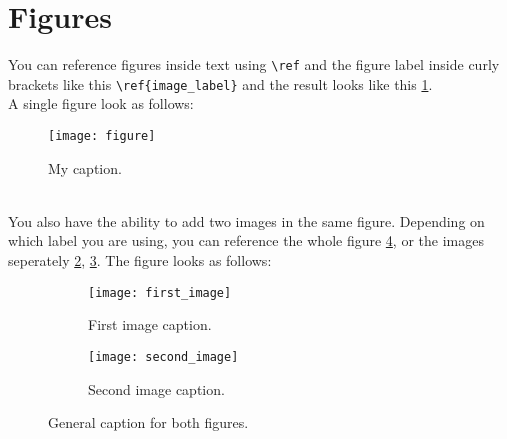 \section{Figures}
You can reference figures inside text using \verb|\ref| and the figure label inside curly brackets like this \verb|\ref{image_label}| and the result looks like this \ref{fig:image}. \\

A single figure look as follows:\\
\begin{figure}[ht]
\texttt{[image: figure]}
\caption{My caption.}
\label{fig:image}
\end{figure}
\\
You also have the ability to add two images in the same figure. Depending on which label you are using, you can reference the whole figure \ref{fig:double_image}, or the images seperately \ref{fig:first_image}, \ref{fig:second_image}. The figure looks as follows:
\begin{figure}[ht]
\centering
\begin{subfigure}{.5\textwidth}
\centering
\texttt{[image: first\_image]}
\caption{First image caption.}
\label{fig:first_image}
\end{subfigure}%
\begin{subfigure}{.5\textwidth}
\centering
\texttt{[image: second\_image]}
\caption{Second image caption.}
\label{fig:second_image}
\end{subfigure}%
\caption{General caption for both figures.}
\label{fig:double_image}
\end{figure}
\\

